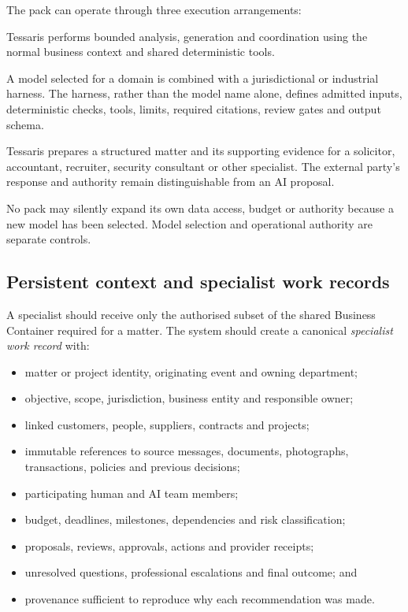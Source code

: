 The pack can operate through three execution arrangements:

\begin{description}[leftmargin=0pt,style=nextline]
  \item[Internal Pilot]
  Tessaris performs bounded analysis, generation and coordination using the
  normal business context and shared deterministic tools.

  \item[Specialist model and harness]
  A model selected for a domain is combined with a jurisdictional or industrial
  harness.  The harness, rather than the model name alone, defines admitted
  inputs, deterministic checks, tools, limits, required citations, review gates
  and output schema.

  \item[External professional or provider]
  Tessaris prepares a structured matter and its supporting evidence for a
  solicitor, accountant, recruiter, security consultant or other specialist.
  The external party's response and authority remain distinguishable from an AI
  proposal.
\end{description}

No pack may silently expand its own data access, budget or authority because a
new model has been selected.  Model selection and operational authority are
separate controls.

\subsection{Persistent context and specialist work records}

A specialist should receive only the authorised subset of the shared Business
Container required for a matter.  The system should create a canonical
\emph{specialist work record} with:

\begin{itemize}[leftmargin=*]
  \item matter or project identity, originating event and owning department;
  \item objective, scope, jurisdiction, business entity and responsible owner;
  \item linked customers, people, suppliers, contracts and projects;
  \item immutable references to source messages, documents, photographs,
        transactions, policies and previous decisions;
  \item participating human and AI team members;
  \item budget, deadlines, milestones, dependencies and risk classification;
  \item proposals, reviews, approvals, actions and provider receipts;
  \item unresolved questions, professional escalations and final outcome; and
  \item provenance sufficient to reproduce why each recommendation was made.
\end{itemize}

